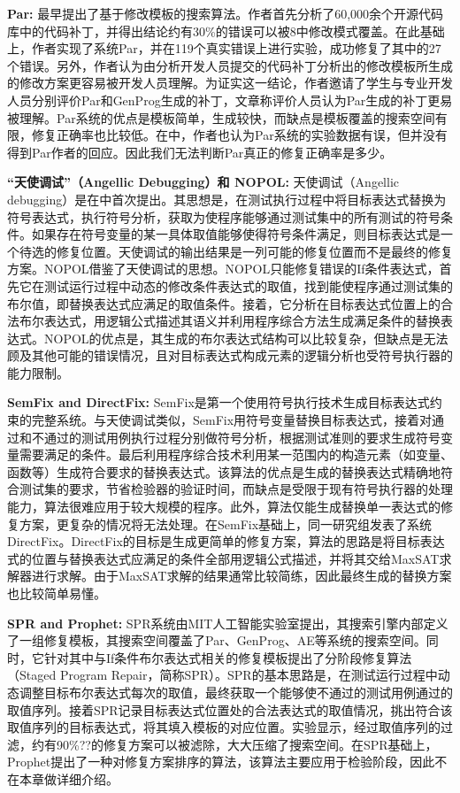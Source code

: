 \textbf{Par:}
\cite{kim2013automatic}最早提出了基于修改模板的搜索算法。作者首先分析了60,000余个开源代码库中的代码补丁，并得出结论约有30\%的错误可以被8中修改模式覆盖。在此基础上，作者实现了系统Par，并在119个真实错误上进行实验，成功修复了其中的27个错误。另外，作者认为由分析开发人员提交的代码补丁分析出的修改模板所生成的修改方案更容易被开发人员理解。为证实这一结论，作者邀请了学生与专业开发人员分别评价Par和GenProg生成的补丁，文章称评价人员认为Par生成的补丁更易被理解。Par系统的优点是模板简单，生成较快，而缺点是模板覆盖的搜索空间有限，修复正确率也比较低。在\cite{qi2015analysis}中，作者也认为Par系统的实验数据有误，但并没有得到Par作者的回应。因此我们无法判断Par真正的修复正确率是多少。

\textbf{“天使调试”（Angellic Debugging）和 NOPOL:}
天使调试（Angellic debugging）是在\cite{chandra2011angelic}中首次提出。其思想是，在测试执行过程中将目标表达式替换为符号表达式，执行符号分析，获取为使程序能够通过测试集中的所有测试的符号条件。如果存在符号变量的某一具体取值能够使得符号条件满足，则目标表达式是一个待选的修复位置。天使调试的输出结果是一列可能的修复位置而不是最终的修复方案。NOPOL\cite{demarco2014automatic}借鉴了天使调试的思想。NOPOL只能修复错误的If条件表达式，首先它在测试运行过程中动态的修改条件表达式的取值，找到能使程序通过测试集的布尔值，即替换表达式应满足的取值条件。接着，它分析在目标表达式位置上的合法布尔表达式，用逻辑公式描述其语义并利用程序综合方法生成满足条件的替换表达式。NOPOL的优点是，其生成的布尔表达式结构可以比较复杂，但缺点是无法顾及其他可能的错误情况，且对目标表达式构成元素的逻辑分析也受符号执行器的能力限制。

\textbf{SemFix and DirectFix:}
SemFix\cite{nguyen2013semfix}是第一个使用符号执行技术生成目标表达式约束的完整系统。与天使调试类似，SemFix用符号变量替换目标表达式，接着对通过和不通过的测试用例执行过程分别做符号分析，根据测试准则的要求生成符号变量需要满足的条件。最后利用程序综合技术利用某一范围内的构造元素（如变量、函数等）生成符合要求的替换表达式。该算法的优点是生成的替换表达式精确地符合测试集的要求，节省检验器的验证时间，而缺点是受限于现有符号执行器的处理能力，算法很难应用于较大规模的程序。此外，算法仅能生成替换单一表达式的修复方案，更复杂的情况将无法处理。在SemFix基础上，同一研究组发表了系统DirectFix\cite{mechtaev2015directfix}。DirectFix的目标是生成更简单的修复方案，算法的思路是将目标表达式的位置与替换表达式应满足的条件全部用逻辑公式描述，并将其交给MaxSAT求解器进行求解。由于MaxSAT求解的结果通常比较简练，因此最终生成的替换方案也比较简单易懂。


\textbf{SPR and Prophet:}
SPR系统\cite{Long:2015:SPR:2786805.2786811}由MIT人工智能实验室提出，其搜索引擎内部定义了一组修复模板，其搜索空间覆盖了Par、GenProg、AE等系统的搜索空间。同时，它针对其中与If条件布尔表达式相关的修复模板提出了分阶段修复算法（Staged Program Repair，简称SPR）。SPR的基本思路是，在测试运行过程中动态调整目标布尔表达式每次的取值，最终获取一个能够使不通过的测试用例通过的取值序列。接着SPR记录目标表达式位置处的合法表达式的取值情况，挑出符合该取值序列的目标表达式，将其填入模板的对应位置。实验显示，经过取值序列的过滤，约有90\%??的修复方案可以被滤除，大大压缩了搜索空间。在SPR基础上，Prophet\cite{long2016automatic}提出了一种对修复方案排序的算法，该算法主要应用于检验阶段，因此不在本章做详细介绍。


